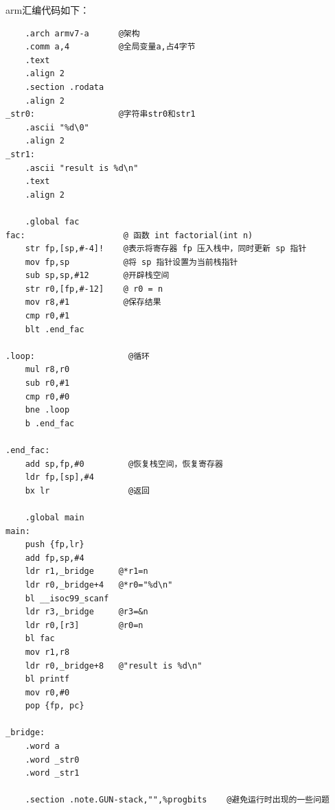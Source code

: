 \documentclass[UTF8,a4paper,10pt]{ctexart}
\begin{document}
arm汇编代码如下：
\begin{lstlisting}
    .arch armv7-a      @架构
    .comm a,4          @全局变量a,占4字节
    .text
    .align 2
    .section .rodata
    .align 2
_str0:                 @字符串str0和str1
    .ascii "%d\0"   
    .align 2
_str1:
    .ascii "result is %d\n"
    .text
    .align 2

    .global fac
fac:                    @ 函数 int factorial(int n)
    str fp,[sp,#-4]!    @表示将寄存器 fp 压入栈中，同时更新 sp 指针
    mov fp,sp           @将 sp 指针设置为当前栈指针
    sub sp,sp,#12       @开辟栈空间
    str r0,[fp,#-12]    @ r0 = n
    mov r8,#1           @保存结果
    cmp r0,#1           
    blt .end_fac

.loop:                   @循环
    mul r8,r0            
    sub r0,#1
    cmp r0,#0
    bne .loop
    b .end_fac

.end_fac:
    add sp,fp,#0         @恢复栈空间，恢复寄存器
    ldr fp,[sp],#4
    bx lr                @返回

    .global main
main:
    push {fp,lr}
    add fp,sp,#4
    ldr r1,_bridge     @*r1=n
    ldr r0,_bridge+4   @*r0="%d\n"
    bl __isoc99_scanf
    ldr r3,_bridge     @r3=&n
    ldr r0,[r3]        @r0=n
    bl fac
    mov r1,r8
    ldr r0,_bridge+8   @"result is %d\n"
    bl printf
    mov r0,#0
    pop {fp, pc}

_bridge:
    .word a
    .word _str0
    .word _str1

    .section .note.GUN-stack,"",%progbits    @避免运行时出现的一些问题
    
\end{lstlisting}



\newpage

 
\end{document}
